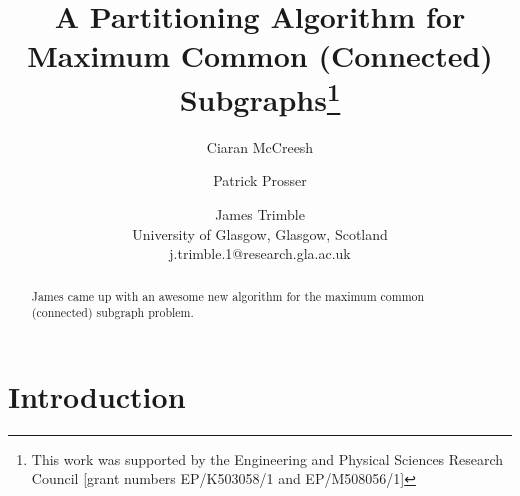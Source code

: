 \documentclass[letterpaper]{article}
\title{A Partitioning Algorithm for Maximum Common (Connected) Subgraphs\thanks{This work
was supported by the Engineering and Physical Sciences Research Council [grant
numbers EP/K503058/1 and EP/M508056/1]}}
\author{Ciaran McCreesh \and Patrick Prosser \and James Trimble \\
University of Glasgow, Glasgow, Scotland \\
j.trimble.1@research.gla.ac.uk}
\begin{document}
\maketitle

\begin{abstract}
    James came up with an awesome new algorithm for the maximum common (connected)
    subgraph problem.
\end{abstract}

\section{Introduction}



\end{document}

